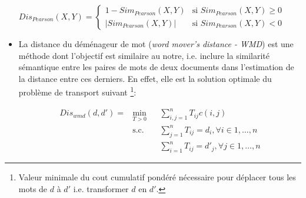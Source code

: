 \begin{itemize}
$Dis_{Pearson}(X,Y) =
\left\{ \begin{array}{ll}
1 - Sim_{Pearson}(X,Y) & \text{si } Sim_{Pearson}(X,Y) \geq 0 \\
\vert Sim_{Pearson}(X,Y) \vert & \text{si } Sim_{Pearson}(X,Y) < 0
\end{array}
\right.$
	\item \og La distance du déménageur de mot \fg{} (\textit{word mover's distance - WMD}) \citep{kusner2015wordmoverdist} est une méthode dont l'objectif est similaire au notre, i.e. inclure la similarité sémantique entre les paires de mots de deux documents dans l'estimation de la distance entre ces derniers. En effet, elle est la solution optimale du problème de transport suivant \footnote{Valeur minimale du cout cumulatif pondéré nécessaire pour déplacer  tous les mots de $d$ à $d'$ i.e. transformer $d$ en $d'$.}:
	
	\begin{equation*}
	\begin{aligned}
Dis_{wmd}(d, d') = 	& \min\limits_{T>0}
	& & \sum\limits_{i,j=1}^n T_{ij} c(i,j) \\
	& \text{s.c.}
	& & \sum\limits_{j=1}^n T_{ij} = d_i, \forall i \in {1, \dots, n} \\
	& 
	& & \sum\limits_{i=1}^n T_{ij} = d'_j, \forall j \in {1, \dots, n}	
	\end{aligned}
	\end{equation*} 
	

\end{itemize}
